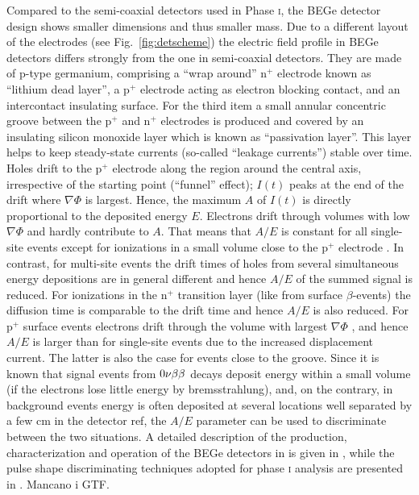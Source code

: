 Compared to the semi-coaxial detectors used in {\gerda} Phase \textsc{i}, the BEGe detector design shows smaller dimensions and thus smaller mass. Due to a different layout of the electrodes (see Fig.~\ref{fig:detscheme}) the electric field profile in BEGe detectors differs strongly from the one in semi-coaxial detectors. They are made of p-type germanium, comprising a ``wrap around'' n$^+$ electrode known as ``lithium dead layer'', a p$^+$ electrode acting as electron blocking contact, and an intercontact insulating surface. For the third item a small annular concentric groove between the p$^+$ and n$^+$ electrodes is produced and covered by an insulating silicon monoxide layer which is known as ``passivation layer''. This layer helps to keep steady-state currents (so-called ``leakage currents'') stable over time. Holes drift to the p$^+$ electrode along the region around the central axis, irrespective of the starting point (``funnel'' effect); $I(t)$ peaks at the end of the drift where $\nabla\Phi$ is largest. Hence, the maximum $A$ of $I(t)$ is directly proportional to the deposited energy $E$. Electrons drift through volumes with low $\nabla\Phi$ and hardly contribute to $A$. That means that $A/E$ is constant for all single-site events except for ionizations in a small volume close to the p$^+$ electrode \cite{PSD1, PSD2, PSD3}. In contrast, for multi-site events the drift times of holes from several simultaneous energy depositions are in general different and hence $A/E$ of the summed signal is reduced. For ionizations in the n$^+$ transition layer (like from surface $\beta$-events) the diffusion time is comparable to the drift time and hence $A/E$ is also reduced. For p$^+$ surface events electrons drift through the volume with largest $\nabla\Phi$ , and hence $A/E$ is larger than for single-site events due to the increased displacement current. The latter is also the case for events close to the groove. Since it is known that signal events from $0\nu\beta\beta$ decays deposit energy within a small volume (if the electrons lose little energy by bremsstrahlung), and, on the contrary, in background events energy is often deposited at several locations well separated by a few cm in the detector {\color{red}ref}, the $A/E$ parameter can be used to discriminate between the two situations. A detailed description of the production, characterization and operation of the BEGe detectors in {\gerda} is given in \cite{detectors}, while the pulse shape discriminating techniques adopted for phase \textsc{i} analysis are presented in \cite{PSDgerda}. {\color{red}Mancano i GTF.}


